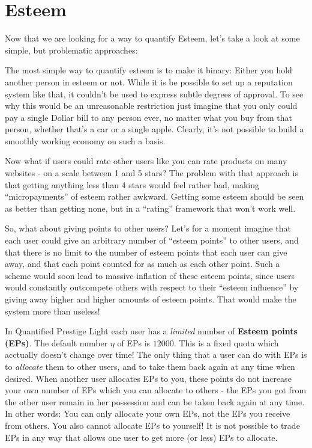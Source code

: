 \documentclass[a4paper,12pt]{scrartcl}
\newcounter{motivation}
\newcounter{comment}
\begin{document}
\section{Esteem}
Now that we are looking for a way to quantify Esteem, let's take a look at some simple, but problematic approaches:
\begin{mdframed}[style=motivation, comment=Quantifying esteem - binary]
The most simple way to quantify esteem is to make it binary: Either you hold another person in esteem or not. While it is be possible to set up a reputation system like that, it couldn't be used to express subtle degrees of approval. To see why this would be an unreasonable restriction just imagine that you only could pay a single Dollar bill to any person ever, no matter what you buy from that person, whether that's a car or a single apple. Clearly, it's not possible to build a smoothly working economy on such a basis.     
\end{mdframed}
\begin{mdframed}[style=motivation, comment=Quantifying esteem - ``ratings'']
Now what if users could rate other users like you can rate products on many websites - on a scale between 1 and 5 stars? The problem with that approach is that getting anything less than 4 stars would feel rather bad, making ``micropayments'' of esteem rather awkward. Getting some esteem should be seen as better than getting none, but in a ``rating'' framework that won't work well.     
\end{mdframed}
\begin{mdframed}[style=motivation, comment=Quantifying esteem - unlimited points]
So, what about giving points to other users? Let's for a moment imagine that each user could give an arbitrary number of ``esteem points'' to other users, and that there is no limit to the number of esteem points that each user can give away, and that each point counted for as much as each other point. Such a scheme would soon lead to massive inflation of these esteem points, since users would constantly outcompete others with respect to their ``esteem influence'' by giving away higher and higher amounts of esteem points. That would make the system more than useless!    
\end{mdframed}
In Quantified Prestige Light each user has a \textit{limited} number of \textbf{Esteem points (EPs)}. The default number $\eta$ of EPs is $12000$. This is a fixed quota which acctually doesn't change over time! The only thing that a user can do with EPs is to \textit{allocate} them to other users, and to take them back again at any time when desired. When another user allocates EPs to you, these points do not increase your own number of EPs which you can allocate to others - the EPs you got from the other user remain in her possession and can be taken back again at any time. In other words: You can only allocate your own EPs, not the EPs you receive from others. You also cannot allocate EPs to yourself! It is not possible to trade EPs in any way that allows one user to get more (or less) EPs to allocate.
\end{document}
